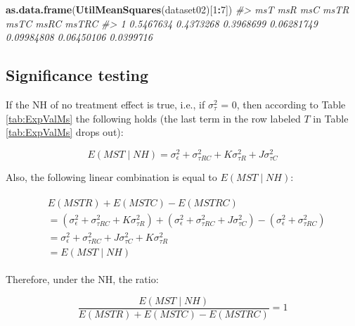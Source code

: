 \documentclass[
]{book}
\newenvironment{Shaded}{\begin{snugshade}}{\end{snugshade}}
\newcommand{\CommentTok}[1]{\textcolor[rgb]{0.56,0.35,0.01}{\textit{#1}}}
\newcommand{\DecValTok}[1]{\textcolor[rgb]{0.00,0.00,0.81}{#1}}
\newcommand{\KeywordTok}[1]{\textcolor[rgb]{0.13,0.29,0.53}{\textbf{#1}}}
\newcommand{\NormalTok}[1]{#1}
\newcommand{\OperatorTok}[1]{\textcolor[rgb]{0.81,0.36,0.00}{\textbf{#1}}}
\begin{document}
\begin{Shaded}
\begin{Highlighting}[]
\KeywordTok{as.data.frame}\NormalTok{(}\KeywordTok{UtilMeanSquares}\NormalTok{(dataset02)[}\DecValTok{1}\OperatorTok{:}\DecValTok{7}\NormalTok{])}
\CommentTok{#>         msT       msR       msC       msTR       msTC       msRC     msTRC}
\CommentTok{#> 1 0.5467634 0.4373268 0.3968699 0.06281749 0.09984808 0.06450106 0.0399716}
\end{Highlighting}
\end{Shaded}

\hypertarget{dbm-analysis-significance-testing-sig-testing}{%
\subsection{Significance testing}\label{dbm-analysis-significance-testing-sig-testing}}

If the NH of no treatment effect is true, i.e., if \(\sigma_{\tau}^{2}\) = 0, then according to Table \ref{tab:ExpValMs} the following holds (the last term in the row labeled \(T\) in Table \ref{tab:ExpValMs} drops out):

\begin{equation}
E\left ( MST\mid NH \right ) = \sigma_{\epsilon}^{2} + \sigma_{\tau RC}^{2} + K\sigma_{\tau R}^{2} + J\sigma_{\tau C}^{2}
\label{eq:ExpMST}
\end{equation}

Also, the following linear combination is equal to \(E\left ( MST\mid NH \right )\):

\begin{align}
\begin{split}
&E\left ( MSTR \right ) + E\left ( MSTC \right )  - E\left ( MSTRC \right ) \\
&= \left (\sigma_{\epsilon}^{2} + \sigma_{\tau RC}^{2} + K\sigma_{\tau R}^{2} \right ) + \left (\sigma_{\epsilon}^{2} + \sigma_{\tau RC}^{2} + J\sigma_{\tau C}^{2} \right ) -\left (\sigma_{\epsilon}^{2} + \sigma_{\tau RC}^{2}  \right ) \\
&= \sigma_{\epsilon}^{2} + \sigma_{\tau RC}^{2} + J \sigma_{\tau C}^{2} +  K\sigma_{\tau R}^{2} \\
&= E\left ( MST\mid NH \right )
\end{split}
\label{eq:linearComb}
\end{align}

Therefore, under the NH, the ratio:

\begin{equation}
\frac{E\left ( MST\mid NH \right )}{E\left ( MSTR \right ) + E\left ( MSTC \right )  - E\left ( MSTRC \right )} = 1
\label{eq:ConstrFRatio}
\end{equation}
\end{document}
